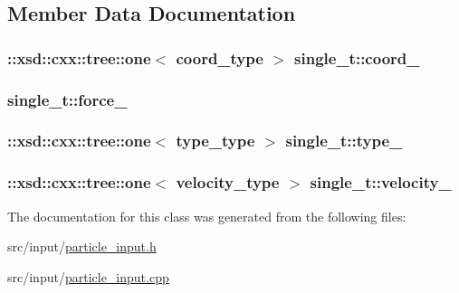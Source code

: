 \subsection{Member Data Documentation}
\subsubsection[{\texorpdfstring{coord\+\_\+}{coord_}}]{\setlength{\rightskip}{0pt plus 5cm}\+::xsd\+::cxx\+::tree\+::one$<$ {\bf coord\+\_\+type} $>$ single\+\_\+t\+::coord\+\_\+\hspace{0.3cm}{\ttfamily [protected]}}\hypertarget{classsingle__t_a88c8130f542d90b17800fe59ed9aabed}{}\label{classsingle__t_a88c8130f542d90b17800fe59ed9aabed}
\subsubsection[{\texorpdfstring{force\+\_\+}{force_}}]{ single\+\_\+t\+::force\+\_\+\hspace{0.3cm}{\ttfamily [protected]}}\hypertarget{classsingle__t_a1e9b2a89d19cfdd6842b3611c8dac6cc}{}\label{classsingle__t_a1e9b2a89d19cfdd6842b3611c8dac6cc}
\subsubsection[{\texorpdfstring{type\+\_\+}{type_}}]{\setlength{\rightskip}{0pt plus 5cm}\+::xsd\+::cxx\+::tree\+::one$<$ {\bf type\+\_\+type} $>$ single\+\_\+t\+::type\+\_\+\hspace{0.3cm}{\ttfamily [protected]}}\hypertarget{classsingle__t_a4df4719166dbbf3b754b192f386aa974}{}\label{classsingle__t_a4df4719166dbbf3b754b192f386aa974}
\subsubsection[{\texorpdfstring{velocity\+\_\+}{velocity_}}]{\setlength{\rightskip}{0pt plus 5cm}\+::xsd\+::cxx\+::tree\+::one$<$ {\bf velocity\+\_\+type} $>$ single\+\_\+t\+::velocity\+\_\+\hspace{0.3cm}{\ttfamily [protected]}}\hypertarget{classsingle__t_ae84160509acab4c517aa11c096dd54dd}{}\label{classsingle__t_ae84160509acab4c517aa11c096dd54dd}


The documentation for this class was generated from the following files\+:\begin{DoxyCompactItemize}
\item 
src/input/\hyperlink{particle__input_8h}{particle\+\_\+input.\+h}\item 
src/input/\hyperlink{particle__input_8cpp}{particle\+\_\+input.\+cpp}\end{DoxyCompactItemize}
